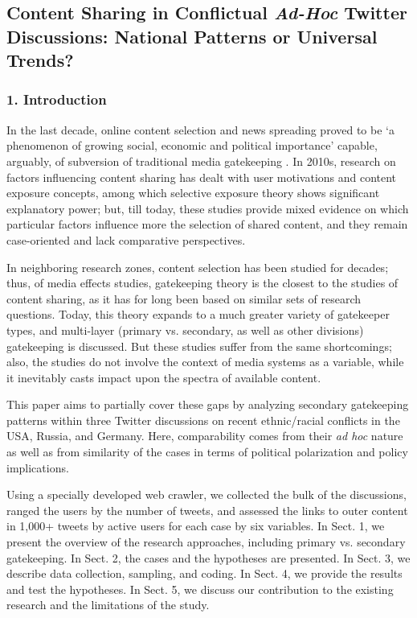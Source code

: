 \subsection{Content Sharing in Conflictual \textit{Ad-Hoc} Twitter Discussions: National Patterns or Universal Trends?}\label{subsec:ch2/sec5/sub2}

\subsubsection{1. Introduction}

In the last decade, online content selection and news spreading proved to be ‘a phenomenon of growing social, economic and political importance’ \cite[p.~331]{LeeMa} capable, arguably, of subversion of traditional media gatekeeping \cite{Carr}. In 2010s, research on factors influencing content sharing has dealt with user motivations and content exposure concepts, among which selective exposure theory shows significant explanatory power; but, till today, these studies provide mixed evidence on which particular factors influence more the selection of shared content, and they remain case-oriented and lack comparative perspectives.

In neighboring research zones, content selection has been studied for decades; thus, of media effects studies, gatekeeping theory is the closest to the studies of content sharing, as it has for long been based on similar sets of research questions. Today, this theory expands to a much greater variety of gatekeeper types, and multi-layer (primary vs. secondary, as well as other divisions) gatekeeping is discussed. But these studies suffer from the same shortcomings; also, the studies do not involve the context of media systems as a variable, while it inevitably casts impact upon the spectra of available content.

This paper aims to partially cover these gaps by analyzing secondary gatekeeping patterns within three Twitter discussions on recent ethnic/racial conflicts in the USA, Russia, and Germany. Here, comparability comes from their \textit{ad hoc} nature \cite{BrunsBurgess} as well as from similarity of the cases in terms of political polarization and policy implications.

Using a specially developed web crawler, we collected the bulk of the discussions, ranged the users by the number of tweets, and assessed the links to outer content in 1,000+ tweets by active users for each case by six variables. In Sect. 1, we present the overview of the research approaches, including primary vs. secondary gatekeeping. In Sect. 2, the cases and the hypotheses are presented. In Sect. 3, we describe data collection, sampling, and coding. In Sect. 4, we provide the results and test the hypotheses. In Sect. 5, we discuss our contribution to the existing research and the limitations of the study.

